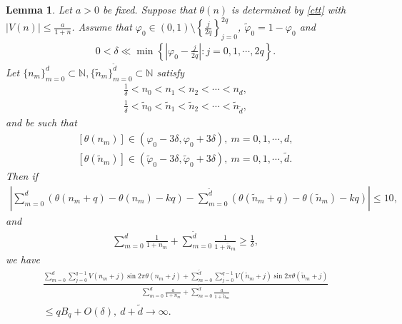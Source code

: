 \documentclass[12pt]{amsart}
\newcommand{\abs}[1]{\left\lvert #1 \right\rvert}
\theoremstyle{plain}
\newtheorem{lemma}[theorem]{Lemma}
\theoremstyle{definition}
\begin{document}
		\begin{lemma}\label{lemmaduichencancel}	Let $a>0$ be fixed.
		Suppose that $\theta(n)$ is determined by \eqref{ctt} with $\abs{V(n)}\leq\frac{a}{1+n}$. 
		Assume that $\varphi_0\in (0,1)\setminus \left\{\frac{j}{2q}\right\}_{j=0}^{2q}$,  $\tilde{\varphi}_0=1-\varphi_0$ and
		\begin{align}
			0<\delta\ll \min\left\{\abs{\varphi_0-\frac{j}{2q}}:j=0,1,\cdots,2q\right\}.\label{dlld1}
		\end{align} 
	Let $\{n_m\}_{m=0}^d\subset\mathbb{N},\{\tilde{n}_m\}_{m=0}^{\tilde{d}}\subset\mathbb{N}$ satisfy
		\begin{align}
			\frac{1}{\delta}<n_0<n_1<n_2<\cdots<n_d,\nonumber\\
			\frac{1}{\delta}<\tilde{n}_0<\tilde{n}_1<\tilde{n}_2<\cdots<\tilde{n}_{\tilde{d}},\nonumber
		\end{align}
		and be such that
		\begin{align}
			\label{theta0neighbour}\left[\theta(n_m)\right]\in (\varphi_0-3\delta,\varphi_0+3\delta),\ m=0,1,\cdots,d,\\
			\label{thetatilde0neighbour}\left[\theta(\tilde{n}_m)\right]\in (\tilde{\varphi}_0-3\delta,\tilde{\varphi}_0+3\delta),\ m=0,1,\cdots,\tilde{d}.
		\end{align}
		Then if
		\begin{align}
			\abs{\sum_{m=0}^d(\theta(n_m+q)-\theta(n_m)-kq)-\sum_{m=0}^{\tilde{d}}(\theta(\tilde{n}_m+q)-\theta(\tilde{n}_m)-kq)}\leq 10,\label{thetanmtildethetanmleq10}
		\end{align}
		and 
		\begin{align}\label{tiaohejishugeq}
		\sum_{m=0}^{d}\frac{1}{1+n_{m}}+\sum_{m=0}^{\tilde{d}}\frac{1}{1+\tilde{n}_{m}}\geq \frac{1}{\delta},
		\end{align}		
		we have
		\begin{align}
			\frac{\sum_{m=0}^{d}\sum_{j=0}^{q-1}V(n_{m}+j)\sin2\pi\theta(n_{m}+j)+\sum_{m=0}^{\tilde{d}}\sum_{j=0}^{q-1}V(\tilde{n}_{m}+j)\sin2\pi\theta(\tilde{n}_{m}+j)}{\sum_{m=0}^{d}\frac{a}{1+n_{m}}+\sum_{m=0}^{\tilde{d}}\frac{a}{1+\tilde{n}_{m}}}\label{lemmaduichenfinal}\\
			\leq qB_q+O(\delta),\ d+{\tilde{d}}\to\infty.\nonumber
		\end{align}
	\end{lemma}
	
\end{document}
